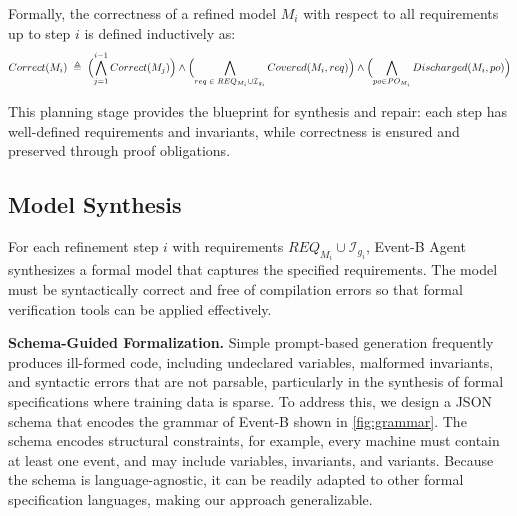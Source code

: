 Formally, the correctness of a refined model $M_i$ with respect to all requirements up to step $i$ is defined inductively as:
{\footnotesize \begin{equation}
    Correct(M_i) \;\triangleq\; 
    \Bigl(\bigwedge_{j=1}^{i-1} Correct(M_j)\Bigr) 
    \land \Bigl(\bigwedge_{req \; \in \;REQ_{M_i} \cup \mathcal{I}_{g_i}} Covered(M_i, req)\Bigr) 
    \land \Bigl(\bigwedge_{po \in PO_{M_i}} Discharged(M_i, po)\Bigr)
\label{eq:refinement_correctness}
\end{equation}}

This planning stage provides the blueprint for synthesis and repair: each step has well-defined requirements and invariants, while correctness is ensured and preserved through proof obligations.


\subsection{Model Synthesis} \label{sec:modelsynthesis}

For each refinement step $i$ with requirements $REQ_{M_i} \cup \mathcal{I}_{g_i}$, Event-B Agent synthesizes a formal model that captures the specified requirements.
The model must be syntactically correct and free of compilation errors so that formal verification tools can be applied effectively.

\noindent
\textbf{Schema-Guided Formalization.} 
Simple prompt-based generation frequently produces ill-formed code, including undeclared variables, malformed invariants, and syntactic errors that are not parsable, particularly in the synthesis of formal specifications where training data is sparse.
To address this, we design a JSON schema that encodes the grammar of Event-B shown in \autoref{fig:grammar}.
The schema encodes structural constraints, for example, every machine must contain at least one event, and may include variables, invariants, and variants.
Because the schema is language-agnostic, it can be readily adapted to other formal specification languages, making our approach generalizable.

